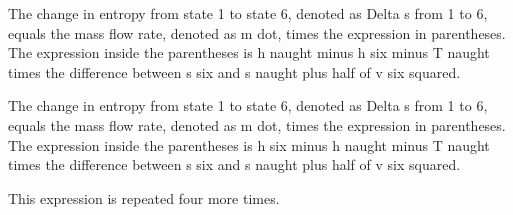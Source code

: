 The change in entropy from state 1 to state 6, denoted as Delta s from 1 to 6, equals the mass flow rate, denoted as m dot, times the expression in parentheses. The expression inside the parentheses is h naught minus h six minus T naught times the difference between s six and s naught plus half of v six squared.

The change in entropy from state 1 to state 6, denoted as Delta s from 1 to 6, equals the mass flow rate, denoted as m dot, times the expression in parentheses. The expression inside the parentheses is h six minus h naught minus T naught times the difference between s six and s naught plus half of v six squared.

This expression is repeated four more times.